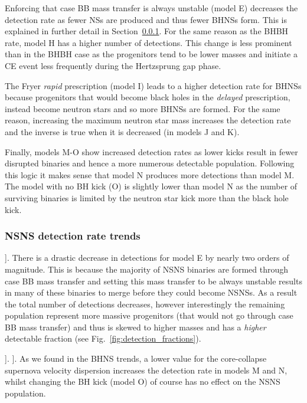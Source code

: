 \documentclass[twocolumn]{aastex63}
\newcommand{\todo}[1]{{\color{red}{[TODO: #1}]}}
\newcommand{\modCaseBB}{E}
\newcommand{\modOpt}{H}
\newcommand{\modRapid}{I}
\newcommand{\modNSLow}{J}
\newcommand{\modNSHigh}{K}
\newcommand{\modSigLow}{M}
\newcommand{\modSigLower}{N}
\newcommand{\modNoBH}{O}
\begin{document}
Enforcing that case BB mass transfer is always unstable (model \modCaseBB{}) decreases the detection rate as fewer NSs are produced and thus fewer BHNSs form. This is explained in further detail in Section~\ref{sec:NSNS_detection_trends}. For the same reason as the BHBH rate, model \modOpt{} has a higher number of detections. This change is less prominent than in the BHBH case as the progenitors tend to be lower masses and initiate a CE event less frequently during the Hertzsprung gap phase. 

The Fryer \textit{rapid} prescription (model \modRapid{}) leads to a higher detection rate for BHNSs because progenitors that would become black holes in the \textit{delayed} prescription, instead become neutron stars and so more BHNSs are formed. For the same reason, increasing the maximum neutron star mass increases the detection rate and the inverse is true when it is decreased (in models \modNSLow{} and \modNSHigh{}).

Finally, models \modSigLow{}-\modNoBH{} show increased detection rates as lower kicks result in fewer disrupted binaries and hence a more numerous detectable population. Following this logic it makes sense that model \modSigLower{} produces more detections than model \modSigLow{}. The model with no BH kick (\modNoBH{}) is slightly lower than model \modSigLower{} as the number of surviving binaries is limited by the neutron star kick more than the black hole kick.

\subsubsection{NSNS detection rate trends}\label{sec:NSNS_detection_trends}

\todo{understand the $\beta$ trends}. There is a drastic decrease in detections for model \modCaseBB{} by nearly two orders of magnitude. This is because the majority of NSNS binaries are formed through case BB mass transfer and setting this mass transfer to be always unstable results in many of these binaries to merge before they could become NSNSs. As a result the total number of detections decreases, however interestingly the remaining population represent more massive progenitors (that would not go through case BB mass transfer) and thus is skewed to higher masses and has a \textit{higher} detectable fraction (see Fig.~\ref{fig:detection_fractions}).

\todo{come back to CE ones once we understand the BHNS ones}. \todo{weirdly basically no change in rapid and max NS masses}. As we found in the BHNS trends, a lower value for the core-collapse supernova velocity dispersion increases the detection rate in models \modSigLow{} and \modSigLower{}, whilst changing the BH kick (model \modNoBH{}) of course has no effect on the NSNS population.
\end{document}
